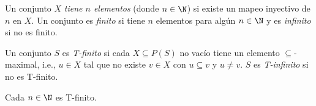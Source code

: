 Un conjunto $X$ \emph{tiene $n$ elementos} (donde $n \in \N$) si existe un mapeo inyectivo de $n$ en $X$. Un conjunto es \emph{finito} si tiene $n$ elementos para algún $n \in \N$ y es \emph{infinito} si no es finito.

Un conjunto $S$ es \emph{T-finito} si cada $X \subseteq P(S)$ no vacío tiene un elemento $\subseteq$-maximal, i.e., $u \in X$ tal que no existe $v \in X$ con $u \subseteq v$ y $u \neq v$. $S$ es \emph{T-infinito} si no es T-finito.

\begin{exercise}[1.10]
  Cada $n \in \N$ es T-finito.
\end{exercise}